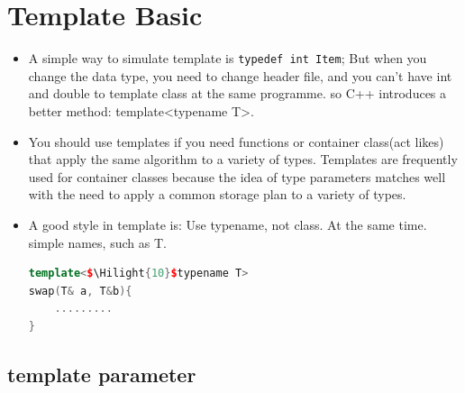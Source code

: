 \documentclass[a4paper,11pt,twoside]{book}
\newcommand{\Hilight}[1]{\makebox[0pt][l]{\color{yellow}\rule[-3pt]{#1em}{11pt}}}
\newcommand{\Hilight}[1]{}
\begin{document}
\section{Template Basic}
\begin{itemize}
\item A simple way to simulate template is \verb=typedef int Item=; But when you change the data type, you need to change header file, and you can't have int and double to template class at the same programme. so C++ introduces a better method: template<typename T>.

\item You should use templates if you need functions or container class(act likes) that apply the same algorithm to a variety of types. Templates are frequently used for container classes because the idea of type parameters matches well with the need to apply a common storage plan to a variety of types.

\item A good style in template is: Use typename, not class. At the same time. simple names, such as T.
\begin{lstlisting}[frame=single, language=c++]
template<$\Hilight{10}$typename T> 
swap(T& a, T&b){
	.........
}
\end{lstlisting}

\end{itemize}

\subsection{template parameter}
\end{document}
